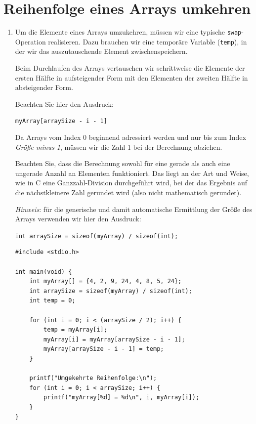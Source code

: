 \chapter{Reihenfolge eines Arrays umkehren}

\begin{enumerate}
    \item Um die Elemente eines Arrays umzukehren, müssen wir eine typische
    \texttt{swap}-Operation realisieren. Dazu brauchen wir eine
    temporäre Variable (\texttt{temp}), in der wir das auszutauschende
    Element zwischenspeichern.

    Beim Durchlaufen des Arrays vertauschen wir schrittweise die Elemente der
    ersten Hälfte in aufsteigender Form mit den Elementen der zweiten Hälfte in
    absteigender Form.

    Beachten Sie hier den Ausdruck:

    \noindent\texttt{myArray[arraySize - i - 1]}

    Da Arrays vom Index 0 beginnend adressiert werden und nur bis zum Index
    \textit{Größe minus 1}, müssen wir die Zahl 1 bei der Berechnung abziehen.

    Beachten Sie, dass die Berechnung sowohl für eine gerade als auch eine
    ungerade Anzahl an Elementen funktioniert. Das liegt an der Art und Weise,
    wie in C eine Ganzzahl-Division durchgeführt wird, bei der das Ergebnis auf
    die nächstkleinere Zahl gerundet wird (also nicht mathematisch gerundet).

    \textit{Hinweis}: für die generische und damit automatische Ermittlung der
    Größe des Arrays verwenden wir hier den Ausdruck:

    \noindent\texttt{int arraySize = sizeof(myArray) / sizeof(int);}

\begin{verbatim}
#include <stdio.h>

int main(void) {
    int myArray[] = {4, 2, 9, 24, 4, 8, 5, 24};
    int arraySize = sizeof(myArray) / sizeof(int);
    int temp = 0;

    for (int i = 0; i < (arraySize / 2); i++) {
        temp = myArray[i];
        myArray[i] = myArray[arraySize - i - 1];
        myArray[arraySize - i - 1] = temp;
    }

    printf("Umgekehrte Reihenfolge:\n");
    for (int i = 0; i < arraySize; i++) {
        printf("myArray[%d] = %d\n", i, myArray[i]);
    }
}
\end{verbatim}


\end{enumerate}
